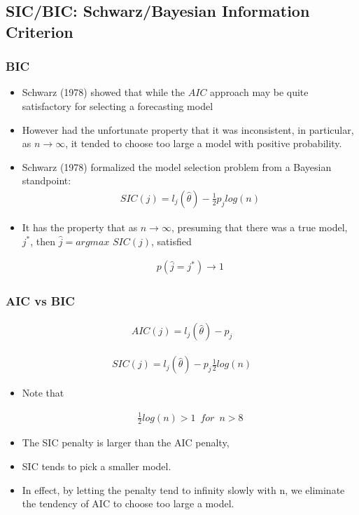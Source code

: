 \documentclass[
  shownotes,
  xcolor={svgnames},
  hyperref={colorlinks,citecolor=DarkBlue,linkcolor=DarkRed,urlcolor=DarkBlue}
  ]{beamer}
\begin{document}
\subsection{SIC/BIC: Schwarz/Bayesian Information Criterion}
\begin{frame}[fragile]
\frametitle{BIC}
\begin{itemize}
\item Schwarz (1978) showed that while the $AIC$ approach may be quite satisfactory for selecting a forecasting model 
\item However had the unfortunate property that it was inconsistent, in particular, as $n \rightarrow \infty$, it tended to choose too large a model with positive probability. 

\item Schwarz (1978) formalized the model selection problem from a Bayesian standpoint: 
\begin{align}
SIC(j) = l_j(\hat \theta) -\frac{1}{2} p_j log(n)
\end{align}

\item It has the property that as $n\rightarrow \infty$, presuming that there was a true model, $j^*$, then $\hat j =argmax\,\, SIC(j)$, satisfied

\begin{align}
p(\hat j = j^*) \rightarrow 1
\end{align}
\end{itemize}
\end{frame}
\begin{frame}[fragile]
\frametitle{AIC vs BIC}

\begin{align}
AIC(j) = l_j(\hat \theta) - p_j
\end{align}


\begin{align}
SIC(j) = l_j(\hat \theta) -  p_j \frac{1}{2} log(n)
\end{align}

\begin{itemize}
\item Note that  

\begin{align}
\frac{1}{2} log(n) > 1 \,\,\, for \,\,\, n > 8
\end{align}

 \item The SIC penalty is larger than the AIC penalty, 
 \item SIC tends to pick a smaller model. 
 \item In effect, by letting the penalty tend to infinity slowly with n, we eliminate the tendency of AIC to choose too large a model.

\end{itemize}
\end{frame}
\end{document}
